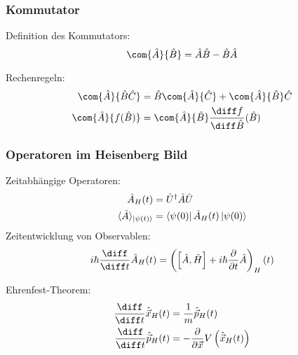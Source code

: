 \documentclass[11pt]{article}
\numberwithin{equation}{section}
\begin{document}
      \subsubsection{Kommutator}
        Definition des Kommutators:
        \begin{equation}
          \com{\hat{A}}{\hat{B}} = \hat{A}\hat{B} - \hat{B}\hat{A}
        \end{equation}

        Rechenregeln:
        \begin{equation}
          \begin{aligned}
            \com{\hat{A}}{\hat{B}\hat{C}}
            &= \hat{B}\com{\hat{A}}{\hat{C}} + \com{\hat{A}}{\hat{B}}\hat{C} \\
            \com{\hat{A}}{f(\hat{B})}
            &= \com{\hat{A}}{\hat{B}}\tder{f}{\hat{B}}(\hat{B})
          \end{aligned}
        \end{equation}

      \subsubsection{Operatoren im Heisenberg Bild}
        Zeitabhängige Operatoren:
        \begin{equation}
          \begin{aligned}
            \hat{A}_H(t) &= \hat{U}^\dagger \hat{A} \hat{U} \\
            \langle \hat{A} \rangle_{\Ket{\psi(t)}} &= \Bra{\psi(0)}\hat{A}_H(t)\Ket{\psi(0)}
          \end{aligned}
        \end{equation}
        Zeitentwicklung von Observablen:
        \begin{equation}
          i\hbar \tder{}{t} \hat{A}_H(t) = \left(\left[\hat{A}, \hat{H}\right] + i\hbar \pder{}{t} \hat{A}\right)_H (t)
        \end{equation}

        Ehrenfest-Theorem:
        \begin{equation}
          \begin{aligned}
            \tder{}{t} \hat{\vec{x}}_H(t) &= \frac{1}{m}\hat{\vec{p}}_H(t) \\
            \tder{}{t} \hat{\vec{p}}_H(t) &= - \pder{}{\vec{x}} V \left(\hat{\vec{x}}_H(t)\right) \\
          \end{aligned}
        \end{equation}
\end{document}
